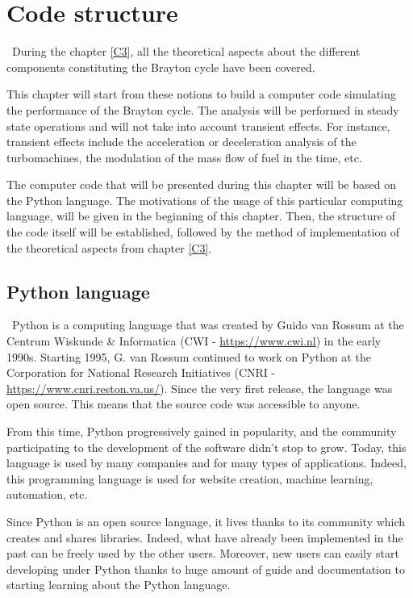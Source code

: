 \graphicspath{{Chapter_4_-_Code_structure/Images/}}
\chapter{Code structure}
\quad\, During the chapter \ref{C3}, all the theoretical aspects about the different components constituting the Brayton cycle have been covered. 

This chapter will start from these notions to build a computer code simulating the performance of the Brayton cycle. The analysis will be performed in steady state operations and will not take into account transient effects. For instance, transient effects include the acceleration or deceleration analysis of the turbomachines, the modulation of the mass flow of fuel in the time, etc.

The computer code that will be presented during this chapter will be based on the Python language\citep{van1995python}. The motivations of the usage of this particular computing language, will be given in the beginning of this chapter. Then, the structure of the code itself will be established, followed by the method of implementation of the theoretical aspects from chapter \ref{C3}.

\section{Python language}
\quad\, Python is a computing language that was created by Guido van Rossum at the Centrum Wiskunde \& Informatica (CWI - \url{https://www.cwi.nl}) in the early 1990s. Starting 1995, G. van Rossum continued to work on Python at the Corporation for National Research Initiatives (CNRI - \url{https://www.cnri.reston.va.us/}). Since the very first release, the language was open source. This means that the source code was accessible to anyone. 

From this time, Python progressively gained in popularity, and the community participating to the development of the software didn't stop to grow. Today, this language is used by many companies and for many types of applications. Indeed, this programming language is used for website creation, machine learning, automation, etc. 

Since Python is an open source language, it lives thanks to its community which creates and shares libraries. Indeed, what have already been implemented in the past can be freely used by the other users. Moreover, new users can easily start developing under Python thanks to huge amount of guide and documentation to starting learning about the Python language.

